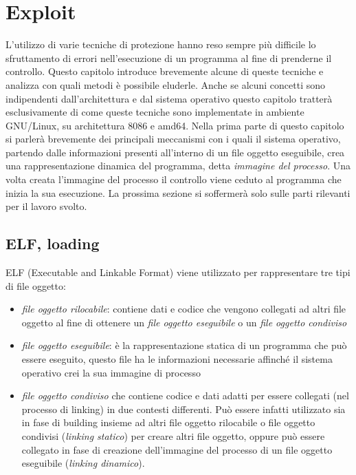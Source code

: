 \chapter{Exploit}

L'utilizzo di varie tecniche di protezione hanno reso sempre più
difficile lo sfruttamento di errori nell'esecuzione di un programma al
fine di prenderne il controllo. Questo capitolo introduce brevemente
alcune di queste tecniche e analizza con quali metodi è possibile
eluderle. Anche se alcuni concetti sono indipendenti dall'architettura
e dal sistema operativo questo capitolo tratterà esclusivamente di come
queste tecniche sono implementate in ambiente GNU/Linux, su
architettura 8086 e amd64. Nella prima parte di questo capitolo si
parlerà brevemente dei principali meccanismi con i quali il sistema
operativo, partendo dalle informazioni presenti all'interno di un file
oggetto eseguibile, crea una rappresentazione dinamica del programma,
detta \emph{immagine del processo}. Una volta creata l'immagine del
processo il controllo viene ceduto al programma che inizia la sua
esecuzione. La prossima sezione si soffermerà solo sulle parti
rilevanti per il lavoro svolto.

\section{ELF, loading}

ELF (Executable and Linkable Format) viene utilizzato per 
rappresentare tre tipi di file oggetto:

\begin{itemize}
  \item \emph{file oggetto rilocabile}: contiene dati e codice che
    vengono collegati ad altri file oggetto al fine di ottenere un
    \emph{file oggetto eseguibile} o un \emph{file oggetto condiviso}

  \item \emph{file oggetto eseguibile}: è la rappresentazione statica
    di un programma che può essere eseguito, questo file ha le
    informazioni necessarie affinché il sistema operativo crei la sua
    immagine di processo

  \item \emph{file oggetto condiviso} che contiene codice e dati
    adatti per essere collegati (nel processo di linking) in due
    contesti differenti. Può essere infatti utilizzato sia in fase di
    building insieme ad altri file oggetto rilocabile o file oggetto
    condivisi (\emph{linking statico}) per creare altri file oggetto,
    oppure può essere collegato in fase di creazione dell'immagine del
    processo di un file oggetto eseguibile (\emph{linking dinamico}).

\end{itemize}

